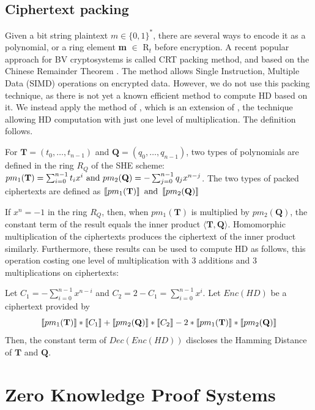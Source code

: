 \subsection{Ciphertext packing}
\label{sub:ciphertext_packing}
Given a bit string plaintext $m \in \{0,1\}^*$, there are several ways to encode it as a polynomial, or a ring element \textbf{m} $\in$ R$_{t}$ before
encryption. A recent popular approach for BV cryptosystems is called CRT packing
method, and based on the Chinese Remainder Theorem \cite{smart2014fully}. The
method allows Single Instruction, Multiple Data (SIMD) operations on encrypted
data. However, we do not use this packing technique, as there is not yet a known
efficient method to compute HD based on it. We instead apply the method of
\cite{yasuda2014practical}, which is an extension of \cite{naehrig2011can},
the technique allowing HD computation with just one level of multiplication. The
definition follows.
\begin{definition}
  For $\mathbf{T} = (t_0, \dots, t_{n-1})$ and
  $\mathbf{Q} = (q_0, \dots, q_{n-1})$, two types of polynomials are defined in
  the ring $R_Q$ of the SHE scheme:
  $ pm_1(\mathbf{T}) = \sum_{i=0}^{n-1}t_ix^i \ \textnormal{and} \
  pm_2(\mathbf{Q}) = - \sum_{j=0}^{n-1}q_jx^{n-j} $.  The two types of packed
  ciphertexts are defined as
  $ \left\llbracket pm_{1}(\mathbf{T})\right\rrbracket \textnormal{ and } \left\llbracket pm_2(\mathbf{Q})\right\rrbracket $
\end{definition}
If $x^n = -1$ in the ring $R_Q$, then, when $pm_1(\mathbf{T})$ is multiplied by
$pm_2(\mathbf{Q})$, the constant term of the result equals the inner product $\langle \mathbf{T}, \mathbf{Q}\rangle$. Homomorphic multiplication of the ciphertexts produces the ciphertext of the
inner product similarly. Furthermore, these results can be used to compute HD as
follows, this operation costing one level of multiplication with 3 additions and 3
multiplications on ciphertexts:

\begin{theorem}
  \label{theo:HDComputation}
  Let $C_1 = - \sum_{i=0}^{n-1}x^{n-i}$ and
  $C_2 = 2 - C_1 = \sum_{i=0}^{n-1}x^i$. Let $Enc(HD)$ be a ciphertext provided by
  \[
    \left\llbracket pm_{1}(\mathbf{T})\right\rrbracket*\left\llbracket C_1 \right\rrbracket + \left\llbracket pm_{2}(\mathbf{Q})\right\rrbracket*
    \left\llbracket C_2 \right\rrbracket - 2*\left\llbracket pm_{1}(\mathbf{T})\right\rrbracket*\left\llbracket pm_{2}(\mathbf{Q})\right\rrbracket
  \]
  Then, the constant term of $Dec(Enc(HD))$ discloses the Hamming Distance of
  $\mathbf{T}$ and $\mathbf{Q}$.
\end{theorem}
\section{Zero Knowledge Proof Systems}
\label{sec:defZKP}
